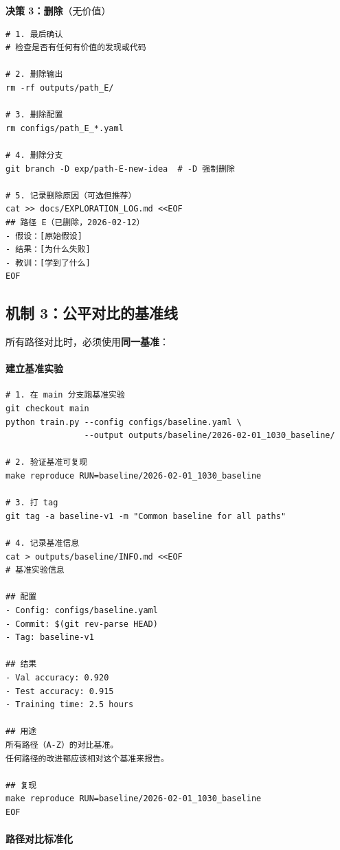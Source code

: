 \textbf{决策 3：删除}（无价值）
\begin{verbatim}
# 1. 最后确认
# 检查是否有任何有价值的发现或代码

# 2. 删除输出
rm -rf outputs/path_E/

# 3. 删除配置
rm configs/path_E_*.yaml

# 4. 删除分支
git branch -D exp/path-E-new-idea  # -D 强制删除

# 5. 记录删除原因（可选但推荐）
cat >> docs/EXPLORATION_LOG.md <<EOF
## 路径 E（已删除，2026-02-12）
- 假设：[原始假设]
- 结果：[为什么失败]
- 教训：[学到了什么]
EOF
\end{verbatim}

\subsection{机制 3：公平对比的基准线}

所有路径对比时，必须使用\textbf{同一基准}：

\paragraph{建立基准实验}

\begin{verbatim}
# 1. 在 main 分支跑基准实验
git checkout main
python train.py --config configs/baseline.yaml \
                --output outputs/baseline/2026-02-01_1030_baseline/

# 2. 验证基准可复现
make reproduce RUN=baseline/2026-02-01_1030_baseline

# 3. 打 tag
git tag -a baseline-v1 -m "Common baseline for all paths"

# 4. 记录基准信息
cat > outputs/baseline/INFO.md <<EOF
# 基准实验信息

## 配置
- Config: configs/baseline.yaml
- Commit: $(git rev-parse HEAD)
- Tag: baseline-v1

## 结果
- Val accuracy: 0.920
- Test accuracy: 0.915
- Training time: 2.5 hours

## 用途
所有路径（A-Z）的对比基准。
任何路径的改进都应该相对这个基准来报告。

## 复现
make reproduce RUN=baseline/2026-02-01_1030_baseline
EOF
\end{verbatim}

\paragraph{路径对比标准化}

